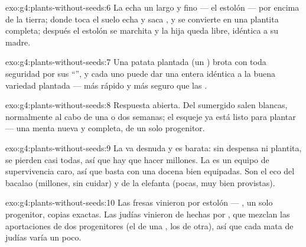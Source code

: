 \begin{solution}{exo:g4:plants-without-seeds:6}
La  echa un  largo y fino --- el estolón --- por encima de
la tierra; donde toca el suelo echa  y saca , y se
convierte en una plantita completa; después el estolón se marchita y
la hija queda libre, idéntica a su madre.
\end{solution}

\begin{solution}{exo:g4:plants-without-seeds:7}
Una patata plantada (un ) brota con toda seguridad por sus
``'', y cada uno puede dar una  entera idéntica a la buena
variedad plantada --- más rápido y más seguro que las .
\end{solution}

\begin{solution}{exo:g4:plants-without-seeds:8}
Respuesta abierta. Del  sumergido salen  blancas,
normalmente al cabo de una o dos semanas; el esqueje ya está listo
para plantar --- una menta nueva y completa, de un solo progenitor.
\end{solution}

\begin{solution}{exo:g4:plants-without-seeds:9}
La  va desnuda y es barata: sin despensa ni plantita, se pierden
casi todas, así que hay que hacer millones. La  es un equipo de
supervivencia caro, así que basta con una docena bien equipadas. Son
el eco del bacalao (millones, sin cuidar) y de la elefanta (pocas, muy
bien provistas).
\end{solution}

\begin{solution}{exo:g4:plants-without-seeds:10}
Las fresas vinieron por estolón --- , un solo
progenitor, copias exactas. Las judías vinieron de  hechas por
, que mezclan las aportaciones de dos progenitores (el  de
una , los  de otra), así que cada mata de judías varía un
poco.
\end{solution}

